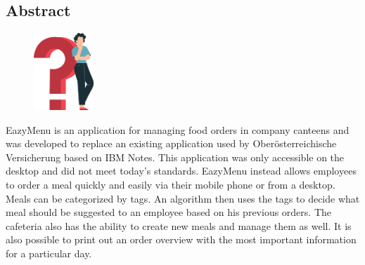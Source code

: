 \begin{spacing}{1}
    \chapter*{Abstract}
\end{spacing}
\begin{figure}
    \begin{center}
      \includegraphics[width=0.2\textwidth]{pics/question_mark.png}
    \end{center}
\end{figure}
EazyMenu is an application for managing food orders in company canteens and was developed to replace an existing application used by Oberösterreichische Versicherung 
based on IBM Notes. 
This application was only accessible on the desktop and did not meet today's standards. 
EazyMenu instead allows employees to order a meal quickly and easily via their mobile phone or from a desktop. 
Meals can be categorized by tags. An algorithm then uses the tags to decide what meal should be suggested to an employee based on his previous orders. 
The cafeteria also has the ability to create new meals and manage them as well. 
It is also possible to print out an order overview with the most important information for a particular day.


\newpage

